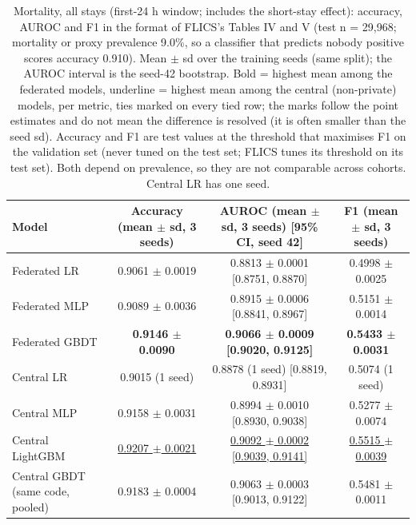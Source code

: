 \begin{table}[t]
\centering\small
\caption{Mortality, all stays (first-24 h window; includes the short-stay effect): accuracy, AUROC and F1 in the format of FLICS's Tables IV and V (test n = 29,968; mortality or proxy prevalence 9.0\%, so a classifier that predicts nobody positive scores accuracy 0.910). Mean $\pm$ sd over the training seeds (same split); the AUROC interval is the seed-42 bootstrap. Bold = highest mean among the federated models, underline = highest mean among the central (non-private) models, per metric, ties marked on every tied row; the marks follow the point estimates and do not mean the difference is resolved (it is often smaller than the seed sd). Accuracy and F1 are test values at the threshold that maximises F1 on the validation set (never tuned on the test set; FLICS tunes its threshold on its test set). Both depend on prevalence, so they are not comparable across cohorts. Central LR has one seed.}\label{tab:final_allstays}
\begin{tabular}{lccc}
\toprule
Model & Accuracy (mean $\pm$ sd, 3 seeds) & AUROC (mean $\pm$ sd, 3 seeds) [95\% CI, seed 42] & F1 (mean $\pm$ sd, 3 seeds) \\
\midrule
Federated LR & 0.9061 $\pm$ 0.0019 & 0.8813 $\pm$ 0.0001 [0.8751, 0.8870] & 0.4998 $\pm$ 0.0025 \\
Federated MLP & 0.9089 $\pm$ 0.0036 & 0.8915 $\pm$ 0.0006 [0.8841, 0.8967] & 0.5151 $\pm$ 0.0014 \\
Federated GBDT & \textbf{0.9146 $\pm$ 0.0090} & \textbf{0.9066 $\pm$ 0.0009 [0.9020, 0.9125]} & \textbf{0.5433 $\pm$ 0.0031} \\
Central LR & 0.9015 (1 seed) & 0.8878 (1 seed) [0.8819, 0.8931] & 0.5074 (1 seed) \\
Central MLP & 0.9158 $\pm$ 0.0031 & 0.8994 $\pm$ 0.0010 [0.8930, 0.9038] & 0.5277 $\pm$ 0.0074 \\
Central LightGBM & \underline{0.9207 $\pm$ 0.0021} & \underline{0.9092 $\pm$ 0.0002 [0.9039, 0.9141]} & \underline{0.5515 $\pm$ 0.0039} \\
Central GBDT (same code, pooled) & 0.9183 $\pm$ 0.0004 & 0.9063 $\pm$ 0.0003 [0.9013, 0.9122] & 0.5481 $\pm$ 0.0011 \\
\bottomrule
\end{tabular}
\end{table}

